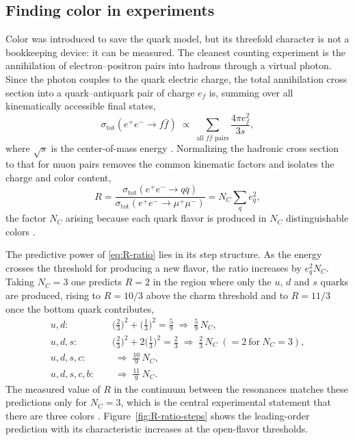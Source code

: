 \FloatBarrier

\subsection{Finding color in experiments}
\label{subsec:color-experiment}

Color was introduced to save the quark model, but its threefold character is not a
bookkeeping device: it can be measured. The cleanest counting experiment is the
annihilation of electron--positron pairs into hadrons through a virtual photon. Since the
photon couples to the quark electric charge, the total annihilation cross section into a
quark--antiquark pair of charge $e_f$ is, summing over all kinematically accessible final
states,
\begin{equation}
    \sigma_{\text{tot}}(e^+e^- \to f\bar f)
    \;\propto\; \sum_{\text{all } f\bar f \text{ pairs}} \frac{4\pi e_f^{2}}{3s},
\end{equation}
where $\sqrt{s}$ is the center-of-mass energy \cite[Ch.~10]{Amsler2018}. Normalizing the
hadronic cross section to that for muon pairs removes the common kinematic factors and
isolates the charge and color content,
\begin{equation}
    R = \frac{\sigma_{\text{tot}}(e^+e^- \to q\bar q)}
             {\sigma_{\text{tot}}(e^+e^- \to \mu^+\mu^-)}
      = N_{C} \sum_q e_q^{2},
    \label{eq:R-ratio}
\end{equation}
the factor $N_{C}$ arising because each quark flavor is produced in $N_{C}$ distinguishable
colors \cite[Ch.~10]{Amsler2018}.

The predictive power of \eqref{eq:R-ratio} lies in its step structure. As the energy
crosses the threshold for producing a new flavor, the ratio increases by $e_q^{2} N_{C}$.
Taking $N_{C} = 3$ one predicts $R = 2$ in the region where only the $u$, $d$ and $s$ quarks
are produced, rising to $R = 10/3$ above the charm threshold and to $R = 11/3$ once the
bottom quark contributes,
\begin{align}
    u,d:   &\quad \big(\tfrac{2}{3}\big)^2 + \big(\tfrac{1}{3}\big)^2 = \tfrac{5}{9}
            \;\Rightarrow\; \tfrac{5}{9}\,N_{C}, \nonumber\\
    u,d,s: &\quad \big(\tfrac{2}{3}\big)^2 + 2\big(\tfrac{1}{3}\big)^2 = \tfrac{2}{3}
            \;\Rightarrow\; \tfrac{2}{3}\,N_{C}\;(=2\ \text{for}\ N_{C}=3), \\
    u,d,s,c:   &\quad \;\Rightarrow\; \tfrac{10}{9}\,N_{C}, \nonumber\\
    u,d,s,c,b: &\quad \;\Rightarrow\; \tfrac{11}{9}\,N_{C}. \nonumber
\end{align}
The measured value of $R$ in the continuum between the resonances matches these
predictions only for $N_{C} = 3$, which is the central experimental statement that there are
three colors \cite[Ch.~10]{Amsler2018}. Figure~\ref{fig:R-ratio-steps} shows the
leading-order prediction with its characteristic increases at the open-flavor thresholds.

